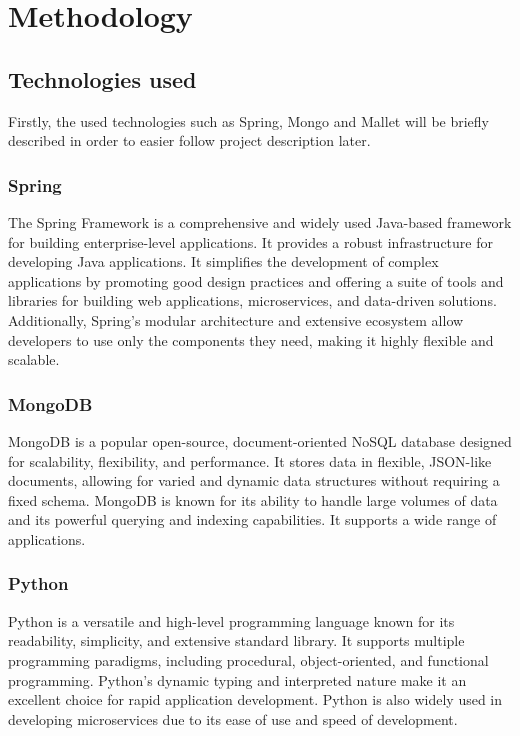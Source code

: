 \chapter{Methodology}\label{ch:met}

\section{Technologies used}
Firstly, the used technologies such as Spring, Mongo and Mallet will be briefly described in order
to easier follow project description later.
\subsection{Spring}
The Spring Framework is a comprehensive and widely used Java-based framework for building
enterprise-level applications. It provides a robust infrastructure for developing Java applications.
It simplifies the development of complex applications by promoting good design practices and
offering a suite of tools and libraries for building web applications, microservices, and
data-driven solutions. Additionally, Spring's modular architecture and extensive ecosystem
allow developers to use only the components they need, making it highly flexible and scalable.
\cite{spring}

\subsection{MongoDB}
MongoDB is a popular open-source, document-oriented NoSQL database designed for scalability,
flexibility, and performance. It stores data in flexible, JSON-like documents, allowing for varied
and dynamic data structures without requiring a fixed schema. MongoDB is known for its ability to handle large
volumes of data and its powerful querying and indexing capabilities. It supports a wide range of applications.
\cite{mongodb}

\subsection{Python}
Python is a versatile and high-level programming language known for its readability, simplicity, and extensive
standard library. It supports multiple programming paradigms, including procedural, object-oriented, and
functional programming. Python's dynamic typing and interpreted nature make it an excellent choice for rapid
application development. Python is also widely used in developing microservices due to its ease of use and
speed of development. \cite{python}


